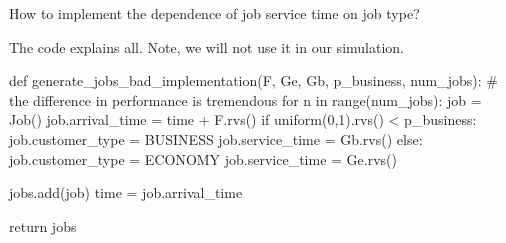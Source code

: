 \begin{exercise}
  How to implement the dependence of job service time on job type?

  \begin{solution}
The code explains all. Note, we will not use it in our simulation. 


\begin{pyverbatim}
def generate_jobs_bad_implementation(F, Ge, Gb, p_business, num_jobs):
    # the difference in performance is tremendous
    for n in range(num_jobs):
        job = Job()
        job.arrival_time = time + F.rvs()  
        if uniform(0,1).rvs() < p_business:
            job.customer_type = BUSINESS
            job.service_time = Gb.rvs()  
        else:
            job.customer_type = ECONOMY
            job.service_time = Ge.rvs()  

        jobs.add(job)
        time = job.arrival_time

    return jobs
        
\end{pyverbatim}
  \end{solution}
\end{exercise}

